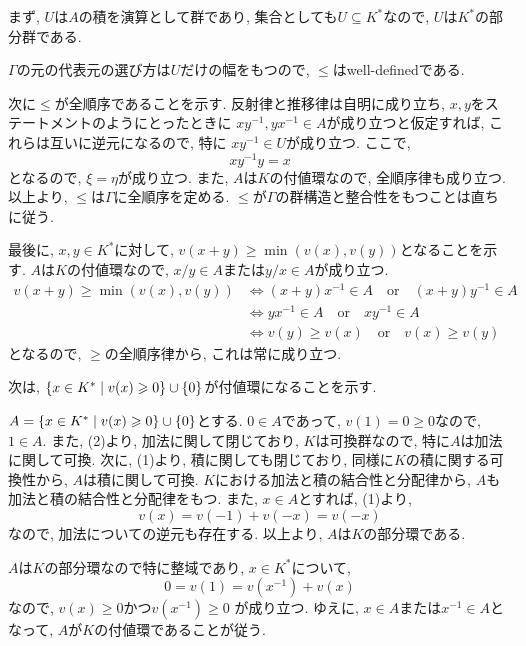 \documentclass[dvipdfmx]{jsarticle}
\begin{document}
    \begin{problem}
        まず, $U$は$A$の積を演算として群であり,
        集合としても$U \subseteq K^\ast$なので, $U$は$K^\ast$の部分群である.

        $\Gamma$の元の代表元の選び方は$U$だけの幅をもつので,
        $\leqslant$はwell-definedである.

        次に$\leqslant$が全順序であることを示す.
        反射律と推移律は自明に成り立ち,
        $x,y$をステートメントのようにとったときに
        $xy^{-1}, yx^{-1} \in A$が成り立つと仮定すれば,
        これらは互いに逆元になるので, 特に
        $xy^{-1} \in U$が成り立つ.
        ここで,
        \[
            xy^{-1}y = x
        \]
        となるので, $\xi = \eta$が成り立つ.
        また, $A$は$K$の付値環なので, 全順序律も成り立つ.
        以上より, $\leqslant$は$\Gamma$に全順序を定める.
        $\leqslant$が$\Gamma$の群構造と整合性をもつことは直ちに従う.

        最後に, $x, y \in K^\ast$に対して, $v(x+y) \geqslant \min(v(x), v(y))$となることを示す.
        $A$は$K$の付値環なので,
        $x/y \in A$または$y/x \in A$が成り立つ.
        \begin{align*}
            v(x+y) \geqslant \min(v(x), v(y))
            &\Longleftrightarrow (x + y)x^{-1} \in A \quad \mbox{or} \quad (x+y)y^{-1} \in A\\
            &\Longleftrightarrow yx^{-1} \in A \quad \mbox{or} \quad xy^{-1} \in A\\
            &\Longleftrightarrow v(y) \geqslant v(x) \quad \mbox{or} \quad v(x) \geqslant v(y)
        \end{align*}
        となるので, $\geqslant$の全順序律から, これは常に成り立つ.
    \end{problem}

    \color{red}
    次は, $\{x \in K^\ast \mid v(x) \geqslant 0\} \cup \{0\}$が付値環になることを示す.
    \color{black}

    \begin{problem}
        $A = \{x \in K^\ast \mid v(x) \geqslant 0\} \cup \{0\}$とする.
        $0 \in A$であって, $v(1) = 0 \geqslant 0$なので, $1 \in A$.
        また, (2)より, 加法に関して閉じており,
        $K$は可換群なので, 特に$A$は加法に関して可換.
        次に, (1)より, 積に関しても閉じており,
        同様に$K$の積に関する可換性から, $A$は積に関して可換.
        $K$における加法と積の結合性と分配律から, $A$も加法と積の結合性と分配律をもつ.
        また, $x \in A$とすれば, (1)より,
        \[
            v(x) = v(-1) + v(-x) = v(-x)
        \]
        なので, 加法についての逆元も存在する.
        以上より, $A$は$K$の部分環である.

        $A$は$K$の部分環なので特に整域であり,
        $x \in K^\ast$について,
        \[
            0 = v(1) = v(x^{-1}) + v(x)
        \]
        なので,
        $v(x) \geqslant 0$かつ$v(x^{-1}) \geqslant 0$
        が成り立つ.
        ゆえに, $x \in A$または$x^{-1} \in A$となって, $A$が$K$の付値環であることが従う.
    \end{problem}
\end{document}
